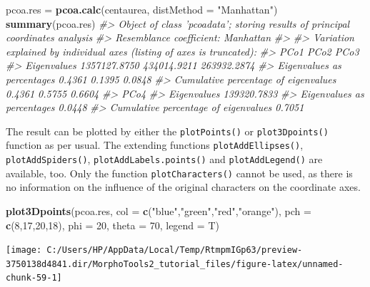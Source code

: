 \documentclass[
]{article}
\newenvironment{Shaded}{\begin{snugshade}}{\end{snugshade}}
\newcommand{\CommentTok}[1]{\textcolor[rgb]{0.56,0.35,0.01}{\textit{#1}}}
\newcommand{\DataTypeTok}[1]{\textcolor[rgb]{0.13,0.29,0.53}{#1}}
\newcommand{\DecValTok}[1]{\textcolor[rgb]{0.00,0.00,0.81}{#1}}
\newcommand{\KeywordTok}[1]{\textcolor[rgb]{0.13,0.29,0.53}{\textbf{#1}}}
\newcommand{\NormalTok}[1]{#1}
\newcommand{\StringTok}[1]{\textcolor[rgb]{0.31,0.60,0.02}{#1}}
\begin{document}
\begin{Shaded}
\begin{Highlighting}[]
\NormalTok{pcoa.res =}\StringTok{ }\KeywordTok{pcoa.calc}\NormalTok{(centaurea, }\DataTypeTok{distMethod =} \StringTok{"Manhattan"}\NormalTok{)}
\KeywordTok{summary}\NormalTok{(pcoa.res)}
\CommentTok{#> Object of class 'pcoadata'; storing results of principal coordinates analysis}
\CommentTok{#> Resemblance coefficient:  Manhattan }
\CommentTok{#> }
\CommentTok{#> Variation explained by individual axes (listing of axes is truncated):}
\CommentTok{#>                                              PCo1        PCo2        PCo3}
\CommentTok{#> Eigenvalues                          1357127.8750 434014.9211 263932.2874}
\CommentTok{#> Eigenvalues as percentages                 0.4361      0.1395      0.0848}
\CommentTok{#> Cumulative percentage of eigenvalues       0.4361      0.5755      0.6604}
\CommentTok{#>                                             PCo4}
\CommentTok{#> Eigenvalues                          139320.7833}
\CommentTok{#> Eigenvalues as percentages                0.0448}
\CommentTok{#> Cumulative percentage of eigenvalues      0.7051}
\end{Highlighting}
\end{Shaded}

The result can be plotted by either the \texttt{plotPoints()} or
\texttt{plot3Dpoints()} function as per usual. The extending functions
\texttt{plotAddEllipses()}, \texttt{plotAddSpiders()},
\texttt{plotAddLabels.points()} and \texttt{plotAddLegend()} are
available, too. Only the function \texttt{plotCharacters()} cannot be
used, as there is no information on the influence of the original
characters on the coordinate axes.

\begin{Shaded}
\begin{Highlighting}[]
\KeywordTok{plot3Dpoints}\NormalTok{(pcoa.res, }\DataTypeTok{col =} \KeywordTok{c}\NormalTok{(}\StringTok{"blue"}\NormalTok{,}\StringTok{"green"}\NormalTok{,}\StringTok{"red"}\NormalTok{,}\StringTok{"orange"}\NormalTok{), }\DataTypeTok{pch =} \KeywordTok{c}\NormalTok{(}\DecValTok{8}\NormalTok{,}\DecValTok{17}\NormalTok{,}\DecValTok{20}\NormalTok{,}\DecValTok{18}\NormalTok{), }
             \DataTypeTok{phi =} \DecValTok{20}\NormalTok{, }\DataTypeTok{theta =} \DecValTok{70}\NormalTok{, }\DataTypeTok{legend =}\NormalTok{ T)}
\end{Highlighting}
\end{Shaded}

\begin{center}\texttt{[image: C:/Users/HP/AppData/Local/Temp/RtmpmIGp63/preview-3750138d4841.dir/MorphoTools2\_tutorial\_files/figure-latex/unnamed-chunk-59-1]} \end{center}
\end{document}
